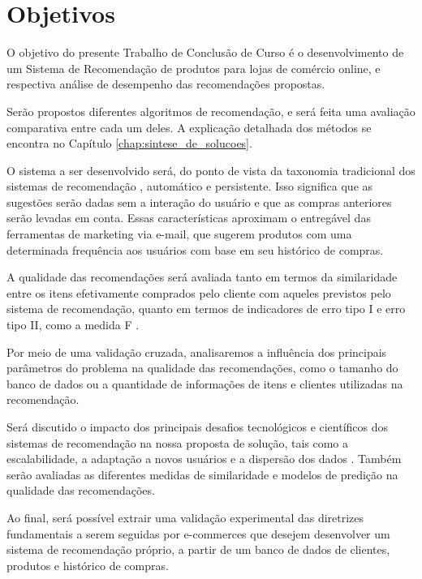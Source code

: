 \chapter[Objetivos]{Objetivos}
\label{chap:objetivos}

O objetivo do presente Trabalho de Conclusão de Curso é o desenvolvimento de um Sistema de Recomendação de produtos para lojas de comércio online, e respectiva análise de desempenho das recomendações propostas. 

Serão propostos diferentes algoritmos de recomendação, e será feita uma avaliação comparativa entre cada um deles. A explicação detalhada dos métodos se encontra no Capítulo \ref{chap:sintese_de_solucoes}.

O sistema a ser desenvolvido será, do ponto de vista da taxonomia tradicional dos sistemas de recomendação \cite{schafer1999recommender}, automático e persistente. Isso significa que as sugestões serão dadas sem a interação do usuário e que as compras anteriores serão levadas em conta. Essas características aproximam o entregável das ferramentas de marketing via e-mail, que sugerem produtos com uma determinada frequência aos usuários com base em seu histórico de compras. 

A qualidade das recomendações será avaliada tanto em termos da similaridade entre os itens efetivamente comprados pelo cliente com aqueles previstos pelo sistema de recomendação, quanto em termos de indicadores de erro tipo I e erro tipo II, como a medida F \cite{sarwar2000analysis}. 

Por meio de uma validação cruzada, analisaremos a influência dos principais parâmetros do problema na qualidade das recomendações, como o tamanho do banco de dados ou a quantidade de informações de itens e clientes utilizadas na recomendação. 

Será discutido o impacto dos principais desafios tecnológicos e científicos dos sistemas de recomendação na nossa proposta de solução, tais como a escalabilidade, a adaptação a novos usuários e a dispersão dos dados \cite{wei2007survey}. Também serão avaliadas as diferentes medidas de similaridade e modelos de predição na qualidade das recomendações. 

Ao final, será possível extrair uma validação experimental das diretrizes fundamentais a serem seguidas por e-commerces que desejem desenvolver um sistema de recomendação próprio, a partir de um banco de dados de clientes, produtos e histórico de compras. 